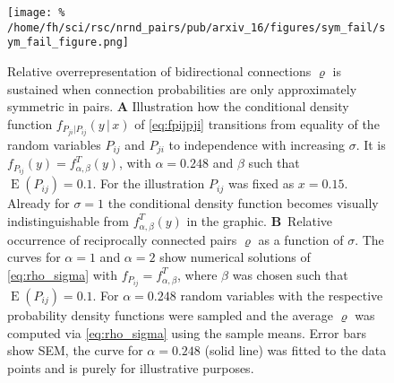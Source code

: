 \begin{figure}[h!]
\centering
\texttt{[image: \%
  /home/fh/sci/rsc/nrnd\_pairs/pub/arxiv\_16/figures/sym\_fail/sym\_fail\_figure.png]}
\caption{Relative overrepresentation of bidirectional connections $\varrho$ is sustained when connection probabilities are only approximately symmetric in pairs. \textbf{A} Illustration how the conditional density function $f_{P_{ji} | P_{ij}} (y\,\vert\, x)$ of \eqref{eq:fpijpji} transitions from equality of the random variables $P_{ij}$ and $P_{ji}$ to independence with increasing $\sigma$. It is $f_{P_{ij}} (y) = f^T_{\alpha,\beta}(y)$, with $\alpha=0.248$ and $\beta$ such that $\operatorname{E}(P_{ij})=0.1$. For the illustration $P_{ij}$ was fixed as $x=0.15$. Already for $\sigma=1$ the conditional density function becomes visually indistinguishable from  $f^T_{\alpha,\beta}(y)$ in the graphic. \textbf{B}~Relative occurrence of reciprocally connected pairs $\varrho$ as a function of $\sigma$. The curves for $\alpha=1$ and $\alpha=2$ show numerical solutions of \eqref{eq:rho_sigma} with $f_{P_{ij}} = f_{\alpha,\beta}^T$, where $\beta$ was chosen such that $\operatorname{E}(P_{ij}) = 0.1$. For $\alpha = 0.248$ random variables with the respective probability density functions were sampled and the average $\varrho$ was computed via \eqref{eq:rho_sigma} using the sample means. Error bars show SEM, the curve for $\alpha = 0.248$ (solid line)  was fitted to the data points and is purely for illustrative purposes.} 
\label{fig:sym_fail}
\end{figure}


%

